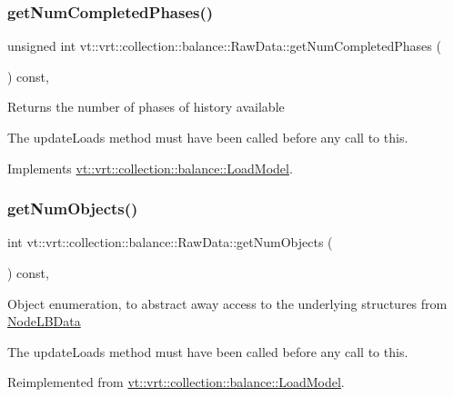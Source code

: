\subsubsection{\texorpdfstring{get\+Num\+Completed\+Phases()}{getNumCompletedPhases()}}
{\footnotesize\ttfamily unsigned int vt\+::vrt\+::collection\+::balance\+::\+Raw\+Data\+::get\+Num\+Completed\+Phases (\begin{DoxyParamCaption}{ }\end{DoxyParamCaption}) const\hspace{0.3cm}{\ttfamily [override]}, {\ttfamily [virtual]}}

Returns the number of phases of history available

The {\ttfamily update\+Loads} method must have been called before any call to this. 

Implements \hyperlink{structvt_1_1vrt_1_1collection_1_1balance_1_1_load_model_abba98976118ff797fc2393a50e3e80d8}{vt\+::vrt\+::collection\+::balance\+::\+Load\+Model}.

\mbox{\label{structvt_1_1vrt_1_1collection_1_1balance_1_1_raw_data_af52829981fa8aec26ac5cfc0a2d29cce}} 
\subsubsection{\texorpdfstring{get\+Num\+Objects()}{getNumObjects()}}
{\footnotesize\ttfamily int vt\+::vrt\+::collection\+::balance\+::\+Raw\+Data\+::get\+Num\+Objects (\begin{DoxyParamCaption}{ }\end{DoxyParamCaption}) const\hspace{0.3cm}{\ttfamily [override]}, {\ttfamily [virtual]}}

Object enumeration, to abstract away access to the underlying structures from \hyperlink{structvt_1_1vrt_1_1collection_1_1balance_1_1_node_l_b_data}{Node\+L\+B\+Data}

The {\ttfamily update\+Loads} method must have been called before any call to this. 

Reimplemented from \hyperlink{structvt_1_1vrt_1_1collection_1_1balance_1_1_load_model_a438cd95f1c60b4232152335c4ee950bc}{vt\+::vrt\+::collection\+::balance\+::\+Load\+Model}.

